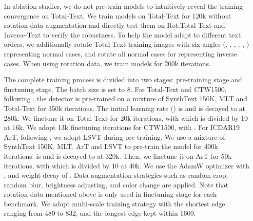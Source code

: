\documentclass[letterpaper]{article} \usepackage{aaai23}  \usepackage{times}  \usepackage{helvet}  \usepackage{courier}  \usepackage[hyphens]{url}  \usepackage{graphicx} \urlstyle{rm}
\begin{document}
In ablation studies, we do not pre-train models to intuitively reveal the training convergence on Total-Text. We train models on Total-Text for 120k without rotation data augmentation and directly test them on Rot.Total-Text and Inverse-Text to verify the robustness. To help the model adapt to different text orders, we additionally rotate Total-Text training images with six angles (, , , , , ) representing normal cases, and rotate all normal cases for  representing inverse cases. When using rotation data, we train models for 200k iterations.

The complete training process is divided into two stages: pre-training stage and finetuning stage. The batch size is set to 8. For Total-Text and CTW1500, following \cite{zhang2022text,9525302}, the detector is pre-trained on a mixture of SynthText 150K, MLT \cite{nayef2019icdar2019} and Total-Text for 350k iterations. The initial learning rate () is  and is decayed to  at 280k. We finetune it on Total-Text for 20k iterations, with   which is divided by 10 at 16k. We adopt 13k finetuning iterations for CTW1500, with  . For ICDAR19 ArT, following \cite{du2022i3cl,baek2020character}, we adopt LSVT \cite{sun2019icdar} during pre-training. We use a mixture of SynthText 150K, MLT, ArT and LSVT to pre-train the model for 400k iterations.  is  and is decayed to  at 320k. Then, we finetune it on ArT for 50k iterations, with   which is divided by 10 at 40k. We use the AdamW optimizer \cite{Loshchilov2019DecoupledWD} with ,  and weight decay of . Data augmentation strategies such as random crop, random blur, brightness adjusting, and color change are applied. Note that rotation data mentioned above is only used in finetuning stage for each benchmark. We adopt multi-scale training strategy with the shortest edge ranging from 480 to 832, and the longest edge kept within 1600.
\end{document}
